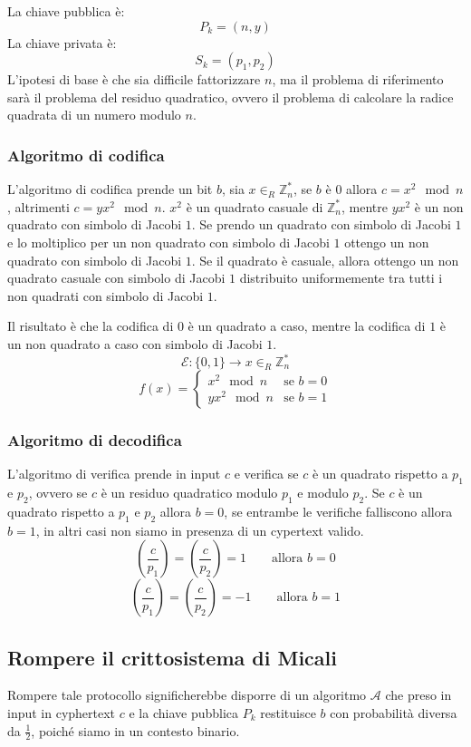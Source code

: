 La chiave pubblica è:
\[
  P_k = (n, y)
\]
La chiave privata è:
\[
  S_k = (p_1, p_2)
\]
L'ipotesi di base è che sia difficile fattorizzare $n$, ma il problema di 
riferimento sarà il problema del residuo quadratico, ovvero il problema di
calcolare la radice quadrata di un numero modulo $n$.
\subsubsection{Algoritmo di codifica}
L'algoritmo di codifica prende un bit $b$, sia $x \in_R \mathbb{Z}_n^*$, se 
$b$ è $0$ allora $c = x^2 \mod n$, altrimenti $c = yx^2 \mod n$. 
$x^2$ è un quadrato casuale di $\mathbb{Z}_n^*$, mentre $yx^2$ è un 
non quadrato con simbolo di Jacobi $1$. Se prendo un quadrato con simbolo di 
Jacobi $1$ e lo moltiplico per un non quadrato con simbolo di Jacobi $1$ ottengo
un non quadrato con simbolo di Jacobi $1$. Se il quadrato è casuale, allora 
ottengo un non quadrato casuale con simbolo di Jacobi $1$ distribuito uniformemente
tra tutti i non quadrati con simbolo di Jacobi $1$.

Il risultato è che la codifica di $0$ è un quadrato a caso, mentre la codifica di $1$ è
un non quadrato a caso con simbolo di Jacobi $1$.
\[
  \mathcal{E}: \{0, 1\} \to x \in_R \mathbb{Z}_n^*
\]
\[
  f(x) = \begin{cases}
    x^2 \mod n & \text{se } b = 0\\
    yx^2 \mod n & \text{se } b = 1
  \end{cases}
\]
\subsubsection{Algoritmo di decodifica}
L'algoritmo di verifica prende in input $c$ e verifica se $c$ è un quadrato 
rispetto a $p_1$ e $p_2$, ovvero se $c$ è un residuo quadratico modulo $p_1$ e
modulo $p_2$. Se $c$ è un quadrato rispetto a $p_1$ e $p_2$ allora $b = 0$,
se entrambe le verifiche falliscono allora $b = 1$, in altri casi non siamo in presenza 
di un cypertext valido.
\[
  \left(\frac{c}{p_1}\right) = \left(\frac{c}{p_2}\right) = 1 \qquad \text{allora } b = 0
\]
\[
  \left(\frac{c}{p_1}\right) = \left(\frac{c}{p_2}\right) = -1 \qquad \text{allora } b = 1
\]
\subsection{Rompere il crittosistema di Micali}
Rompere tale protocollo significherebbe disporre di un algoritmo $\mathcal{A}$ che preso in 
input in cyphertext $c$ e la chiave pubblica $P_k$ restituisce $b$ con probabilità
diversa da $\frac{1}{2}$, poiché siamo in un contesto binario.

